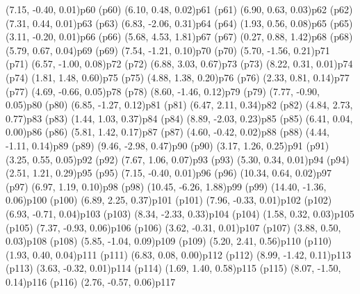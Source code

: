 \psPoint(7.15, -0.40, 0.01){p60}
\psdot(p60)
\psPoint(6.10, 0.48, 0.02){p61}
\psdot(p61)
\psPoint(6.90, 0.63, 0.03){p62}
\psdot(p62)
\psPoint(7.31, 0.44, 0.01){p63}
\psdot(p63)
\psPoint(6.83, -2.06, 0.31){p64}
\psdot(p64)
\psPoint(1.93, 0.56, 0.08){p65}
\psdot(p65)
\psPoint(3.11, -0.20, 0.01){p66}
\psdot(p66)
\psPoint(5.68, 4.53, 1.81){p67}
\psdot(p67)
\psPoint(0.27, 0.88, 1.42){p68}
\psdot(p68)
\psPoint(5.79, 0.67, 0.04){p69}
\psdot(p69)
\psPoint(7.54, -1.21, 0.10){p70}
\psdot(p70)
\psPoint(5.70, -1.56, 0.21){p71}
\psdot(p71)
\psPoint(6.57, -1.00, 0.08){p72}
\psdot(p72)
\psPoint(6.88, 3.03, 0.67){p73}
\psdot(p73)
\psPoint(8.22, 0.31, 0.01){p74}
\psdot(p74)
\psPoint(1.81, 1.48, 0.60){p75}
\psdot(p75)
\psPoint(4.88, 1.38, 0.20){p76}
\psdot(p76)
\psPoint(2.33, 0.81, 0.14){p77}
\psdot(p77)
\psPoint(4.69, -0.66, 0.05){p78}
\psdot(p78)
\psPoint(8.60, -1.46, 0.12){p79}
\psdot(p79)
\psPoint(7.77, -0.90, 0.05){p80}
\psdot(p80)
\psPoint(6.85, -1.27, 0.12){p81}
\psdot(p81)
\psPoint(6.47, 2.11, 0.34){p82}
\psdot(p82)
\psPoint(4.84, 2.73, 0.77){p83}
\psdot(p83)
\psPoint(1.44, 1.03, 0.37){p84}
\psdot(p84)
\psPoint(8.89, -2.03, 0.23){p85}
\psdot(p85)
\psPoint(6.41, 0.04, 0.00){p86}
\psdot(p86)
\psPoint(5.81, 1.42, 0.17){p87}
\psdot(p87)
\psPoint(4.60, -0.42, 0.02){p88}
\psdot(p88)
\psPoint(4.44, -1.11, 0.14){p89}
\psdot(p89)
\psPoint(9.46, -2.98, 0.47){p90}
\psdot(p90)
\psPoint(3.17, 1.26, 0.25){p91}
\psdot(p91)
\psPoint(3.25, 0.55, 0.05){p92}
\psdot(p92)
\psPoint(7.67, 1.06, 0.07){p93}
\psdot(p93)
\psPoint(5.30, 0.34, 0.01){p94}
\psdot(p94)
\psPoint(2.51, 1.21, 0.29){p95}
\psdot(p95)
\psPoint(7.15, -0.40, 0.01){p96}
\psdot(p96)
\psPoint(10.34, 0.64, 0.02){p97}
\psdot(p97)
\psPoint(6.97, 1.19, 0.10){p98}
\psdot(p98)
\psPoint(10.45, -6.26, 1.88){p99}
\psdot(p99)
\psPoint(14.40, -1.36, 0.06){p100}
\psdot(p100)
\psPoint(6.89, 2.25, 0.37){p101}
\psdot(p101)
\psPoint(7.96, -0.33, 0.01){p102}
\psdot(p102)
\psPoint(6.93, -0.71, 0.04){p103}
\psdot(p103)
\psPoint(8.34, -2.33, 0.33){p104}
\psdot(p104)
\psPoint(1.58, 0.32, 0.03){p105}
\psdot(p105)
\psPoint(7.37, -0.93, 0.06){p106}
\psdot(p106)
\psPoint(3.62, -0.31, 0.01){p107}
\psdot(p107)
\psPoint(3.88, 0.50, 0.03){p108}
\psdot(p108)
\psPoint(5.85, -1.04, 0.09){p109}
\psdot(p109)
\psPoint(5.20, 2.41, 0.56){p110}
\psdot(p110)
\psPoint(1.93, 0.40, 0.04){p111}
\psdot(p111)
\psPoint(6.83, 0.08, 0.00){p112}
\psdot(p112)
\psPoint(8.99, -1.42, 0.11){p113}
\psdot(p113)
\psPoint(3.63, -0.32, 0.01){p114}
\psdot(p114)
\psPoint(1.69, 1.40, 0.58){p115}
\psdot(p115)
\psPoint(8.07, -1.50, 0.14){p116}
\psdot(p116)
\psPoint(2.76, -0.57, 0.06){p117}
